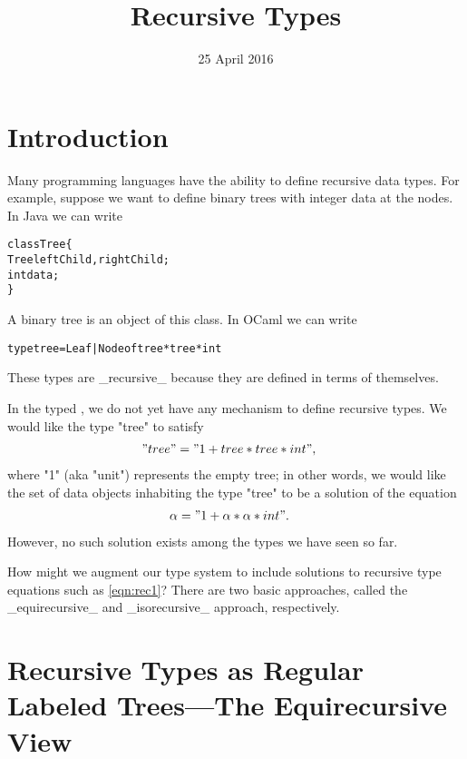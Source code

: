 \title{Recursive Types}
\date{25 April 2016}

\maketitle

\section{Introduction}

Many programming languages have the ability to define recursive data types. For example, suppose we want to define binary trees with integer data at the nodes. In Java we can write
\begin{small}
\begin{alltt}
   class Tree \{
     Tree leftChild, rightChild;
     int data;
   \}
\end{alltt}
\end{small}
A binary tree is an object of this class. In OCaml we can write
\begin{small}
\begin{alltt}
   type tree = Leaf | Node of tree * tree * int
\end{alltt}
\end{small}
These types are _recursive_ because they are defined in terms of themselves.

In the typed \lamcal, we do not yet have any mechanism to define recursive types. We would like the type "tree" to satisfy
\begin{align}
"tree" &= "1 + tree * tree * int",\label{eqn:rec0}
\end{align}
where "1" (aka "unit") represents the empty tree; in other words, we would like the set of data objects inhabiting the type "tree" to be a solution of the equation
\begin{align}
\alpha &= "1 + \alpha * \alpha * int".\label{eqn:rec1}
\end{align}
However, no such solution exists among the types we have seen so far.

How might we augment our type system to include solutions to recursive type equations such as \eqref{eqn:rec1}? There are two basic approaches, called the _equirecursive_ and _isorecursive_ approach, respectively.

\section{Recursive Types as Regular Labeled Trees---The Equirecursive View}

